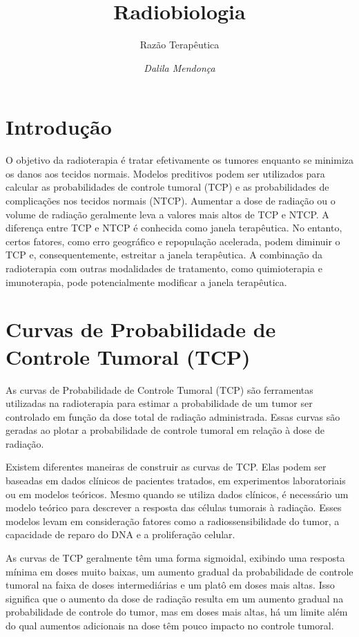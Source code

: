 \documentclass[11pt,a4paper]{article}
\title{\LobsterTwo\Huge{Radiobiologia}}
\author{\LobsterTwo\Large{Razão Terapêutica}\nocite{*}}
\date{\LobsterTwo\textit{Dalila Mendonça}}
\begin{document}
	\maketitle

\section{Introdução}

	O objetivo da radioterapia é tratar efetivamente os tumores enquanto se minimiza os danos aos tecidos normais. Modelos preditivos podem ser utilizados para calcular as probabilidades de controle tumoral (TCP) e as probabilidades de complicações nos tecidos normais (NTCP). Aumentar a dose de radiação ou o volume de radiação geralmente leva a valores mais altos de TCP e NTCP. A diferença entre TCP e NTCP é conhecida como janela terapêutica. No entanto, certos fatores, como erro geográfico e repopulação acelerada, podem diminuir o TCP e, consequentemente, estreitar a janela terapêutica. A combinação da radioterapia com outras modalidades de tratamento, como quimioterapia e imunoterapia, pode potencialmente modificar a janela terapêutica.

\section{Curvas de Probabilidade de Controle Tumoral (TCP)}

	As curvas de Probabilidade de Controle Tumoral (TCP) são ferramentas utilizadas na radioterapia para estimar a probabilidade de um tumor ser controlado em função da dose total de radiação administrada. Essas curvas são geradas ao plotar a probabilidade de controle tumoral em relação à dose de radiação.

	Existem diferentes maneiras de construir as curvas de TCP. Elas podem ser baseadas em dados clínicos de pacientes tratados, em experimentos laboratoriais ou em modelos teóricos. Mesmo quando se utiliza dados clínicos, é necessário um modelo teórico para descrever a resposta das células tumorais à radiação. Esses modelos levam em consideração fatores como a radiossensibilidade do tumor, a capacidade de reparo do DNA e a proliferação celular.

	As curvas de TCP geralmente têm uma forma sigmoidal, exibindo uma resposta mínima em doses muito baixas, um aumento gradual da probabilidade de controle tumoral na faixa de doses intermediárias e um platô em doses mais altas. Isso significa que o aumento da dose de radiação resulta em um aumento gradual na probabilidade de controle do tumor, mas em doses mais altas, há um limite além do qual aumentos adicionais na dose têm pouco impacto no controle tumoral.
\end{document}
